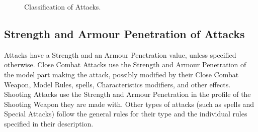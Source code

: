 \newcommand{\figATTAttacks}{Attacks}
\newcommand{\figATTMeleeAttacks}{\begin{minipage}{0.17\unitlength}\begin{center}%
Melee Attacks%
\end{center}\end{minipage}}
\newcommand{\figATTRangedAttacks}{\begin{minipage}{0.17\unitlength}\begin{center}%
Ranged Attacks%
\end{center}\end{minipage}}
\newcommand{\figATTCCAttacks}{\begin{minipage}{0.2\unitlength}\begin{center}%
Close Combat Attacks%
\end{center}\end{minipage}}
\newcommand{\figATTSpeMeleeAttacks}{\begin{minipage}{0.2\unitlength}\begin{center}%
Special Attacks%
\end{center}\end{minipage}}
\newcommand{\figATTShootingAttacks}{\begin{minipage}{0.15\unitlength}\begin{center}%
Shooting Attacks%
\end{center}\end{minipage}}
\newcommand{\figATTOthers}{Others}

\begin{figure}[!htbp]
\centering
\def\svgwidth{0.8\textwidth}

\caption{Classification of Attacks.}
\label{figure/attacks}
\end{figure}

\subsection{Strength and Armour Penetration of Attacks}

Attacks have a Strength and an Armour Penetration value, unless specified otherwise. Close Combat Attacks use the Strength and Armour Penetration of the model part making the attack, possibly modified by their Close Combat Weapon, Model Rules, spells, Characteristics modifiers, and other effects. Shooting Attacks use the Strength and Armour Penetration in the profile of the Shooting Weapon they are made with. Other types of attacks (such as spells and Special Attacks) follow the general rules for their type and the individual rules specified in their description.


